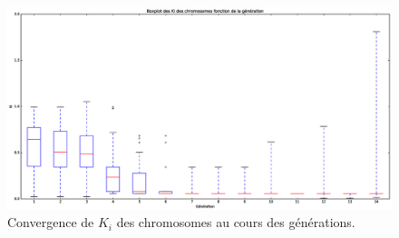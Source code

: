 \documentclass[a4paper,10pt]{report}
\begin{document}
\begin{appendices}
\begin{figure}[htb!]
   \centering
   \includegraphics[scale=0.35]{KiBoxplot.eps}
    \caption{\label{fig:kibox} Convergence de $K_i$ des chromosomes au cours des générations.}
\end{figure}


\end{appendices}
\end{document}

